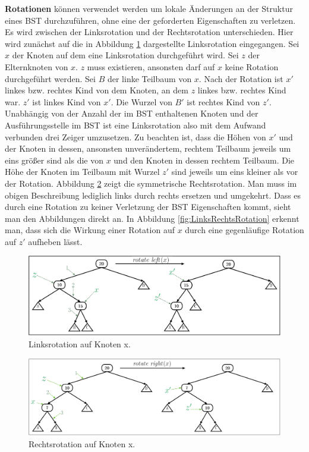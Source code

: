 \documentclass[a4paper,12pt]{article}
\begin{document}
\noindent\textbf{Rotationen} können verwendet werden um lokale Änderungen an der Struktur eines BST durchzuführen, ohne eine der geforderten Eigenschaften zu verletzen. Es wird zwischen der Linksrotation und der Rechtsrotation 
unterschieden. Hier wird zunächst auf die in Abbildung \ref{fig:Linksrotation} dargestellte Linksrotation eingegangen. 
Sei $x$ der Knoten auf dem eine Linksrotation durchgeführt wird. Sei $z$ der Elternknoten von $x$. $z$ muss existieren, ansonsten darf auf $x$ keine Rotation durchgeführt werden. Sei $B$ der linke Teilbaum von $x$. Nach der Rotation ist $x'$ linkes bzw. rechtes Kind von dem Knoten, an dem $z$ linkes bzw. rechtes Kind war. $z'$ ist linkes Kind von $x'$. Die Wurzel von $B '$ ist rechtes Kind von $z'$. Unabhängig von der Anzahl der im BST enthaltenen Knoten und der Ausführungsstelle im BST ist eine Linksrotation also mit dem Aufwand verbunden drei Zeiger umzusetzen. Zu beachten ist, dass die Höhen von $x'$ und der Knoten in dessen, ansonsten unverändertem, rechtem Teilbaum jeweils um eins größer sind als die von $x$ und den Knoten in dessen rechtem Teilbaum. Die Höhe der Knoten im Teilbaum mit Wurzel $z'$ sind jeweils um eins kleiner als vor der Rotation.
Abbildung \ref{fig:Rechtsrotation} zeigt die symmetrische Rechtsrotation. Man muss im obigen Beschreibung lediglich links durch rechts ersetzen und umgekehrt. Dass es durch eine Rotation zu keiner Verletzung der BST Eigenschaften kommt, sieht man den Abbildungen direkt an. In Abbildung \ref{fig:LinksRechtsRotation} erkennt man, dass sich die Wirkung einer Rotation auf $x$ durch eine gegenläufige Rotation auf $z'$ aufheben lässt.  
\begin{figure}[h]
	\centering
	\includegraphics[width= 1.2\textwidth]{"Medien/Einleitung/Linksrotation"}
	\caption{Linksrotation auf Knoten x. }
	\label{fig:Linksrotation}
\end{figure}
\begin{figure}[h]
	\centering
	\includegraphics[width= 1.2\textwidth]{"Medien/Einleitung/Rechtsrotation"}
	\caption{Rechtsrotation auf Knoten x. }
	\label{fig:Rechtsrotation}
\end{figure}
\end{document}
